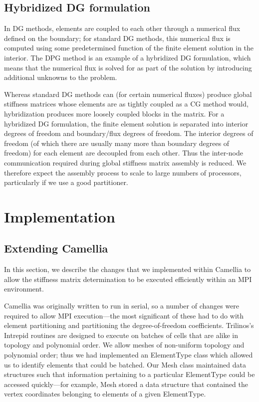 \documentclass{article}
\begin{document}
\subsection{Hybridized DG formulation}

In DG methods, elements are coupled to each other through a numerical flux defined on the boundary; for standard DG methods, this numerical flux is computed using some predetermined function of the finite element solution in the interior. The DPG method is an example of a hybridized DG formulation, which means that the numerical flux is solved for as part of the solution by introducing additional unknowns to the problem. 

Whereas standard DG methods can (for certain numerical fluxes) produce global stiffness matrices whose elements are as tightly coupled as a CG method would, hybridization produces more loosely coupled blocks in the matrix.  For a hybridized DG formulation, the finite element solution is separated into interior degrees of freedom and boundary/flux degrees of freedom. The interior degrees of freedom (of which there are usually many more than boundary degrees of freedom) for each element are decoupled from each other.  Thus the inter-node communication required during global stiffness matrix assembly is reduced. We therefore expect the assembly process to scale to large numbers of processors, particularly if we use a good partitioner.

\section{Implementation}\label{sec:Implementation}

\subsection{Extending Camellia}

In this section, we describe the changes that we implemented within Camellia to allow the stiffness matrix determination to be executed efficiently within an MPI environment.

Camellia was originally written to run in serial, so a number of changes were required to allow MPI execution---the most significant of these had to do with element partitioning and partitioning the degree-of-freedom coefficients.  Trilinos's Intrepid routines are designed to execute on batches of cells that are alike in topology and polynomial order.  We allow meshes of non-uniform topology and polynomial order; thus we had implemented an ElementType class which allowed us to identify elements that could be batched.  Our Mesh class maintained data structures such that information pertaining to a particular ElementType could be accessed quickly---for example, Mesh stored a data structure that contained the vertex coordinates belonging to elements of a given ElementType.
\end{document}
